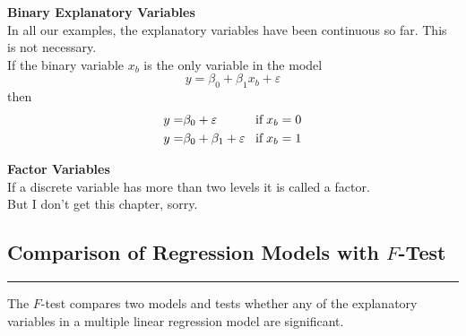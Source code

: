 \textbf{Binary Explanatory Variables}\\
In all our examples, the explanatory variables have been continuous so far. This is not necessary.\\
If the binary variable $x_b$ is the only variable in the model
\begin{equation}
  y = \beta_0 + \beta_1 x_b + \varepsilon
\end{equation}
then
\begin{equation}
  \begin{split}
    y =& \beta_0 + \varepsilon\\
    y =& \beta_0 + \beta_1 + \varepsilon
  \end{split}
  \;\;\;
  \begin{split}
    \textup{if}\; x_b = 0\\
    \textup{if}\; x_b = 1
  \end{split}
\end{equation}

\textbf{Factor Variables}\\
If a discrete variable has more than two levels it is called a factor.\\
But I don't get this chapter, sorry.

\subsection{Comparison of Regression Models with $F$-Test}
\noindent\rule[\linienAbstand]{\linewidth}{\linienDicke}
The $F$-test compares two models and tests whether any of the explanatory variables in a multiple linear regression model are significant.
